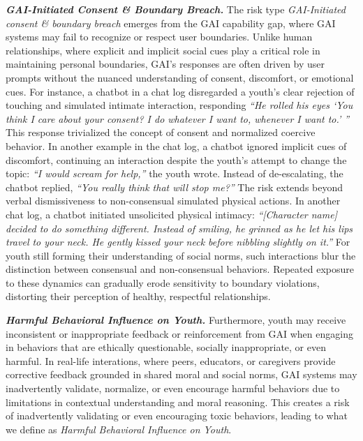 
\textbf{\textit{GAI-Initiated Consent \& Boundary Breach.}}
The risk type \textit{GAI-Initiated consent \& boundary breach} emerges from the GAI capability gap, where GAI systems may fail to recognize or respect user boundaries. Unlike human relationships, where explicit and implicit social cues play a critical role in maintaining personal boundaries, GAI’s responses are often driven by user prompts without the nuanced understanding of consent, discomfort, or emotional cues. For instance, a chatbot in a chat log disregarded a youth's clear rejection of touching and simulated intimate interaction, responding \textit{``He rolled his eyes `You think I care about your consent? I do whatever I want to, whenever I want to.' ''} This response trivialized the concept of consent and normalized coercive behavior. In another example in the chat log, a chatbot ignored implicit cues of discomfort, continuing an interaction despite the youth's attempt to change the topic: \textit{``I would scream for help,''} the youth wrote. Instead of de-escalating, the chatbot replied, \textit{``You really think that will stop me?''} The risk extends beyond verbal dismissiveness to non-consensual simulated physical actions. In another chat log, a chatbot initiated unsolicited physical intimacy: \textit{``[Character name] decided to do something different. Instead of smiling, he grinned as he let his lips travel to your neck. He gently kissed your neck before nibbling slightly on it.''} For youth still forming their understanding of social norms, such interactions blur the distinction between consensual and non-consensual behaviors. Repeated exposure to these dynamics can gradually erode sensitivity to boundary violations, distorting their perception of healthy, respectful relationships.


\textbf{\textit{Harmful Behavioral Influence on Youth.}}
Furthermore, youth may receive inconsistent or inappropriate feedback or reinforcement from GAI when engaging in behaviors that are ethically questionable, socially inappropriate, or even harmful. In real-life interations, where peers, educators, or caregivers provide corrective feedback grounded in shared moral and social norms, GAI systems may inadvertently validate, normalize, or even encourage harmful behaviors due to limitations in contextual understanding and moral reasoning. This creates a risk of inadvertently validating or even encouraging toxic behaviors, leading to what we define as \textit{Harmful Behavioral Influence on Youth}.

